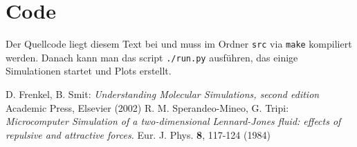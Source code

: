 \documentclass[11pt,a4paper]{article}
\begin{document}
\section{Code} %
\label{sec:code}
Der Quellcode liegt diesem Text bei und muss im Ordner \texttt{src} via \texttt{make} kompiliert werden. Danach kann man das script \texttt{./run.py} ausführen, das einige Simulationen startet und Plots erstellt.


%  
% 
\begin{thebibliography}{xx}
	 D. Frenkel, B. Smit: \emph{Understanding Molecular Simulations, second edition} Academic Press, Elsevier (2002)
	 R. M. Sperandeo-Mineo, G. Tripi: \emph{Microcomputer Simulation of a two-dimensional Lennard-Jones fluid: effects of repulsive and attractive forces.} Eur. J. Phys. \textbf{8}, 117-124 (1984)
\end{thebibliography}
\end{document}
